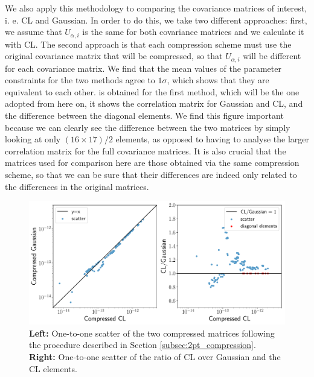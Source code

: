 \documentclass[twocolumn]{\docclass}
\begin{document}
	We also apply this methodology to comparing the covariance matrices of interest, i. e. CL and Gaussian. In order to do this, we take two different approaches: first, we assume that $U_{\alpha, i}$ is the same for both covariance matrices and we calculate it with CL. The second approach is that each compression scheme must use the original covariance matrix that will be compressed, so that $U_{\alpha, i}$ will be different for each covariance matrix. We find that the mean values of the parameter constraints for the two methods agree to $1 \sigma$, which shows that they are equivalent to each other.  is obtained for the first method, which will be the one adopted from here on, it shows the correlation matrix for Gaussian and CL, and the difference between the diagonal elements. We find this figure important because we can clearly see the difference between the two matrices by simply looking at only $(16 \times 17)/2$ elements, as opposed to having to analyse the larger correlation matrix for the full covariance matrices. It is also crucial that the matrices used for comparison here are those obtained via the same compression scheme, so that we can be sure that their differences are indeed only related to the differences in the original matrices.
	
	\begin{figure}
		\includegraphics[width=\columnwidth]{Comp_CL-BJ.pdf}
		\caption{ \textbf{Left:}  One-to-one scatter of the two compressed matrices following the procedure described in Section \ref{subsec:2pt_compression}.  \textbf{Right:}  One-to-one scatter of the ratio of CL over Gaussian and the CL elements. \label{fig:comp-cov_2pt}}
	\end{figure}
	
\end{document}
